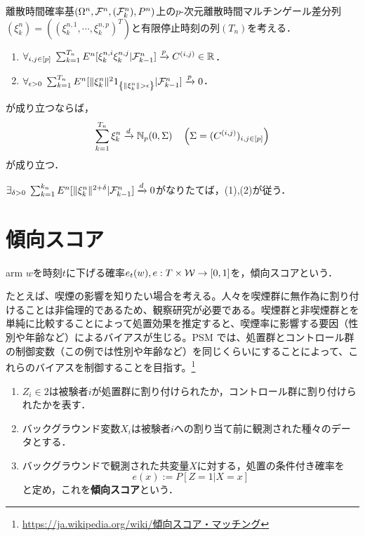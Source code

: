 \documentclass[uplatex,dvipdfmx]{jsreport}
\begin{document}
\begin{theorem}
    離散時間確率基$(\Omega^n,\mathcal{F}^n,(\mathcal{F}^n_k),P^n)$上の$p$-次元離散時間マルチンゲール差分列$(\xi^n_k)=((\xi^{n,1}_k,\cdots,\xi^{n,p}_k)^T)$と有限停止時刻の列$(T_n)$を考える．
    \begin{enumerate}
        \item $\forall_{i,j\in[p]}\;\sum^{T_n}_{k=1}E^n[\xi^{n,i}_k\xi^{n,j}_k|\mathcal{F}^n_{k-1}]\xrightarrow{p}C^{(i,j)}\in\mathbb{R}$．
        \item $\forall_{\ep>0}\;\sum^{T_n}_{k=1}E^n[\norm{\xi^n_k}^21_{\Brace{\norm{\xi^n_k}>\ep}}|\F^n_{k-1}]\xrightarrow{p}0$．
    \end{enumerate}
    が成り立つならば，
    \[\sum^{T_n}_{k=1}\xi^n_k\xrightarrow{d}\mathbb{N}_p(0,\Sigma)\quad\left(\Sigma=(C^{(i,j)})_{i,j\in[p]}\right)\]
    が成り立つ．
\end{theorem}

\begin{lemma}
    $\exists_{\delta>0}\;\sum^{k_n}_{k=1}E^n[\|\xi^n_k\|^{2+\delta}|\mathcal{F}^n_{k-1}]\xrightarrow{d}0$がなりたてば，(1),(2)が従う．
\end{lemma}

\section{傾向スコア}

\begin{tcolorbox}[colframe=ForestGreen, colback=ForestGreen!10!white,breakable,colbacktitle=ForestGreen!40!white,coltitle=black,fonttitle=\bfseries\sffamily,
title=]
    arm $w$を時刻$t$に下げる確率$e_t(w),e:T\times\mathcal{W}\to[0,1]$を，傾向スコアという．
\end{tcolorbox}

たとえば、喫煙の影響を知りたい場合を考える。人々を喫煙群に無作為に割り付けることは非倫理的であるため、観察研究が必要である。喫煙群と非喫煙群とを単純に比較することによって処置効果を推定すると、喫煙率に影響する要因（性別や年齢など）によるバイアスが生じる。PSM では、処置群とコントロール群の制御変数（この例では性別や年齢など）を同じくらいにすることによって、これらのバイアスを制御することを目指す。\footnote{\url{https://ja.wikipedia.org/wiki/傾向スコア・マッチング}}

\begin{definition}\mbox{}
    \begin{enumerate}
        \item $Z_i\in 2$は被験者$i$が処置群に割り付けられたか，コントロール群に割り付けられたかを表す．
        \item バックグラウンド変数$X_i$は被験者$i$への割り当て前に観測された種々のデータとする．
        \item バックグラウンドで観測された共変量$X$に対する，処置の条件付き確率を
        \[e(x):=P[Z=1|X=x]\]
        と定め，これを\textbf{傾向スコア}という．
    \end{enumerate}
\end{definition}
\end{document}
